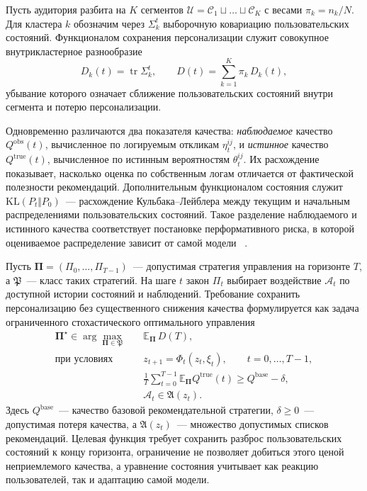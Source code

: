 Пусть аудитория разбита на $K$ сегментов
$\mathcal U=\mathcal C_1\sqcup\dots\sqcup\mathcal C_K$ с весами
$\pi_k=n_k/N$. Для кластера $k$ обозначим через $\Sigma_k^t$ выборочную
ковариацию пользовательских состояний. Функционалом сохранения персонализации
служит совокупное внутрикластерное разнообразие
\begin{equation}
    D_k(t) = \operatorname{tr}\Sigma_k^t,
    \qquad
    D(t) = \sum_{k=1}^{K}\pi_k\, D_k(t),
    \label{eq:diversity}
\end{equation}
убывание которого означает сближение пользовательских состояний внутри сегмента
и потерю персонализации.

Одновременно различаются два показателя качества: \emph{наблюдаемое} качество
$Q^{\mathrm{obs}}(t)$, вычисленное по логируемым откликам $\eta_t^{ij}$, и
\emph{истинное} качество $Q^{\mathrm{true}}(t)$, вычисленное по истинным
вероятностям $\theta_t^{ij}$. Их расхождение показывает, насколько оценка по
собственным логам отличается от фактической полезности рекомендаций. Дополнительным
функционалом состояния служит
$\mathrm{KL}(P_t\Vert P_0)$~--- расхождение Кульбака--Лейблера между текущим и
начальным распределениями пользовательских состояний. Такое разделение
наблюдаемого и истинного качества соответствует постановке перформативного
риска, в которой оцениваемое распределение зависит от самой модели
~\cite{perdomo2020, hardt2025performativePastFuture}.

Пусть $\boldsymbol\Pi=(\Pi_0,\ldots,\Pi_{T-1})$~--- допустимая стратегия
управления на горизонте $T$, а $\mathfrak P$~--- класс таких стратегий. На шаге
$t$ закон $\Pi_t$ выбирает воздействие $\mathcal A_t$ по доступной истории
состояний и наблюдений. Требование сохранить персонализацию без существенного
снижения качества формулируется как задача ограниченного стохастического
оптимального управления
\begin{equation}
    \begin{aligned}
        \boldsymbol\Pi^\star
        \in\arg\max_{\boldsymbol\Pi\in\mathfrak P}\quad&
        \mathbb E_{\boldsymbol\Pi}\,D(T),\\
        \text{при условиях}\quad&
        z_{t+1}=\Phi_t(z_t,\xi_t),\qquad t=0,\ldots,T-1,\\
        &
        \frac{1}{T}\sum_{t=0}^{T-1}
        \mathbb E_{\boldsymbol\Pi}Q^{\mathrm{true}}(t)
        \ge Q^{\mathrm{base}}-\delta,\\
        &
        \mathcal A_t\in\mathfrak A(z_t).
    \end{aligned}
    \label{eq:optimal_control}
\end{equation}
Здесь $Q^{\mathrm{base}}$~--- качество базовой рекомендательной стратегии,
$\delta\ge0$~--- допустимая потеря качества, а $\mathfrak A(z_t)$~--- множество
допустимых списков рекомендаций. Целевая функция требует сохранить разброс
пользовательских состояний к концу горизонта, ограничение не позволяет добиться
этого ценой неприемлемого качества, а уравнение состояния учитывает как реакцию
пользователей, так и адаптацию самой модели.

